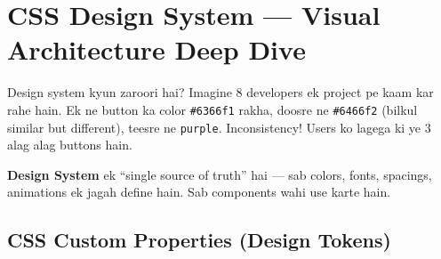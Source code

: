 \documentclass[11pt,a4paper,twoside]{report}
\begin{document}

\chapter{CSS Design System --- Visual Architecture Deep Dive}

\begin{storybox}{Design system kyun zaroori hai?}
Imagine 8 developers ek project pe kaam kar rahe hain. Ek ne button ka color \texttt{\#6366f1} rakha, doosre ne \texttt{\#6466f2} (bilkul similar but different), teesre ne \texttt{purple}. Inconsistency! Users ko lagega ki ye 3 alag alag buttons hain.

\textbf{Design System} ek ``single source of truth'' hai --- sab colors, fonts, spacings, animations ek jagah define hain. Sab components wahi use karte hain.
\end{storybox}

\section{CSS Custom Properties (Design Tokens)}
\end{document}
